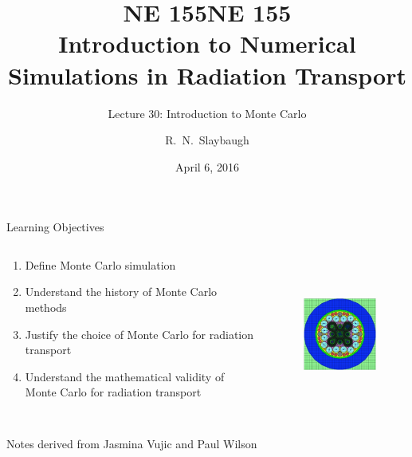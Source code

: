 \documentclass[xcolor=x11names,compress, handout]{beamer}
\title{NE 155}
\author{R.\ N.\ Slaybaugh}
\date{April 6, 2016}
\renewcommand{\(}{\begin{columns}}
\renewcommand{\)}{\end{columns}}
\newcommand{\<}[1]{\begin{column}{#1}}
\renewcommand{\>}{\end{column}}
\begin{document}
\begin{frame}
\title{NE 155\\Introduction to Numerical Simulations in Radiation Transport}
\subtitle{Lecture 30: Introduction to Monte Carlo}
\titlepage
\end{frame}

\begin{frame}{Learning Objectives}

\begin{columns}
  \begin{column}{0.5\textwidth}
    \begin{enumerate}
    \item Define Monte Carlo simulation
    \item Understand the history of Monte Carlo methods
    \item Justify the choice of Monte Carlo for radiation transport
    \item Understand the mathematical validity of Monte Carlo for radiation transport
    \end{enumerate}
  \end{column}
  \begin{column}{0.5\textwidth}
  	\begin{figure}
  	\begin{center}
  		\includegraphics[height=2in,clip]{atr-model}
	\end{center}
  	\end{figure}
  \end{column}
\end{columns}

Notes derived from Jasmina Vujic and Paul Wilson
\end{frame}
\end{document}
